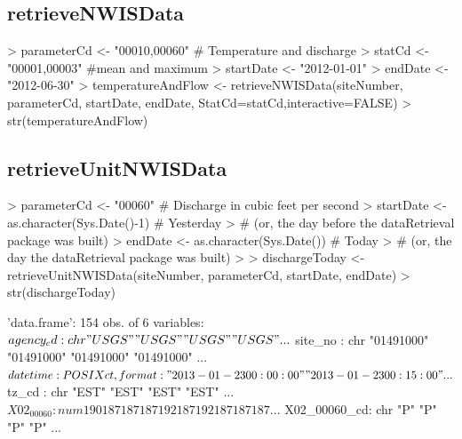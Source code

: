 \documentclass[a4paper,11pt]{article}
\begin{document}
\subsection{retrieveNWISData}
\begin{Schunk}
\begin{Sinput}
> parameterCd <- "00010,00060"  # Temperature and discharge
> statCd <- "00001,00003"  #mean and maximum
> startDate <- "2012-01-01"
> endDate <- "2012-06-30"
> temperatureAndFlow <- retrieveNWISData(siteNumber, parameterCd, 
        startDate, endDate, StatCd=statCd,interactive=FALSE)
> str(temperatureAndFlow)
\end{Sinput}
\end{Schunk}

\subsection{retrieveUnitNWISData}
\begin{Schunk}
\begin{Sinput}
> parameterCd <- "00060"  # Discharge in cubic feet per second
> startDate <- as.character(Sys.Date()-1) # Yesterday 
>   # (or, the day before the dataRetrieval package was built)
> endDate <- as.character(Sys.Date()) # Today 
>   # (or, the day the dataRetrieval package was built)
> 
> dischargeToday <- retrieveUnitNWISData(siteNumber, parameterCd, startDate, endDate)
> str(dischargeToday)
\end{Sinput}
\begin{Soutput}
'data.frame':	154 obs. of  6 variables:
 $ agency_cd   : chr  "USGS" "USGS" "USGS" "USGS" ...
 $ site_no     : chr  "01491000" "01491000" "01491000" "01491000" ...
 $ datetime    : POSIXct, format: "2013-01-23 00:00:00" "2013-01-23 00:15:00" ...
 $ tz_cd       : chr  "EST" "EST" "EST" "EST" ...
 $ X02_00060   : num  190 187 187 187 192 187 192 187 187 187 ...
 $ X02_00060_cd: chr  "P" "P" "P" "P" ...
\end{Soutput}
\end{Schunk}
\end{document}
